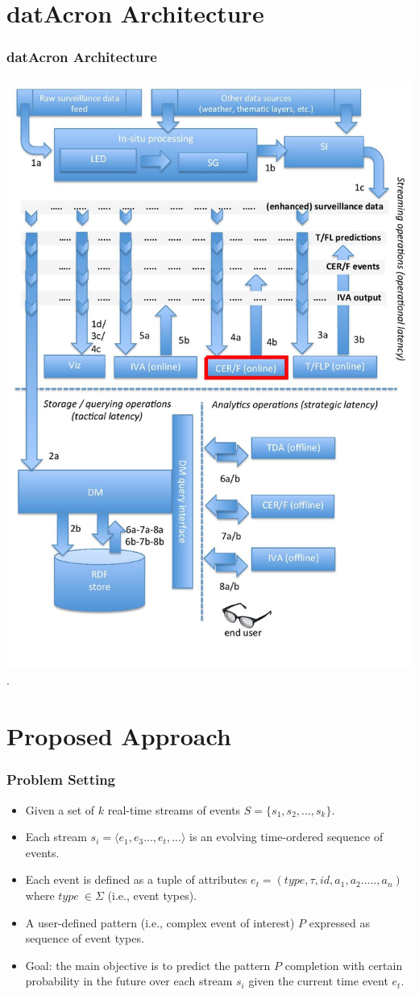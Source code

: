 
\section{datAcron Architecture}		
\frame
{		
	\frametitle{datAcron Architecture}
	\framesubtitle{}
	
	\begin{center}
		\includegraphics[width=.85\textwidth,height=.75\linewidth]{figures/arch2.jpg}\\
		.
	\end{center}
	
}
\section{Proposed Approach}
\frame
{
	\frametitle{Problem Setting}
	
	\begin{itemize}[]
		\item<1->Given a set of $k$ real-time streams of events $S = \{ s_1,s_2, ..., s_k\}$.
		
		\item<1 -> Each stream $s_i=\langle e_1,e_3...,e_t,...\rangle$  is an evolving time-ordered sequence of events.
		
		\item<1 -> Each event is defined as a tuple of attributes $e_t = (type,\tau,id,a_1,a_2.....,a_n)$ where $type\ \in  \Sigma$ (i.e., event types). 
		\item<1-> A user-defined pattern (i.e., complex event of interest) $P$ expressed as sequence of event types.
		
		
		\item<1->Goal: the main objective is to predict the pattern $P$ completion with certain probability in the future over each stream $s_i$ given the current time event $e_t$. 
	\end{itemize}
}

